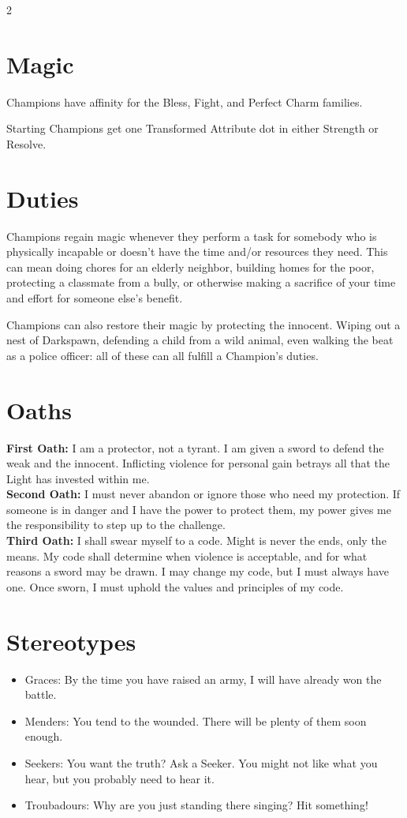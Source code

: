 \begin{multicols}{2}
\section*{Magic}
Champions have affinity for the Bless, Fight, and Perfect Charm families.

Starting Champions get one Transformed Attribute dot in either Strength or Resolve. 

\section*{Duties}
Champions regain magic whenever they perform a task for somebody who is physically incapable or doesn't have the time and/or resources they need. This can mean doing chores for an elderly neighbor, building homes for the poor, protecting a classmate from a bully, or otherwise making a sacrifice of your time and effort for someone else's benefit. 

Champions can also restore their magic by protecting the innocent. Wiping out a nest of Darkspawn, defending a child from a wild animal, even walking the beat as a police officer: all of these can all fulfill a Champion's duties. 

\section*{Oaths}
\noindent \textbf{First Oath:} I am a protector, not a tyrant. I am given a sword to defend the weak and the innocent. Inflicting violence for personal gain betrays all that the Light has invested within me. \\

\noindent \textbf{Second Oath:} I must never abandon or ignore those who need my protection. If someone is in danger and I have the power to protect them, my power gives me the responsibility to step up to the challenge.\\

\noindent \textbf{Third Oath:} I shall swear myself to a code. Might is never the ends, only the means. My code shall determine when violence is acceptable, and for what reasons a sword may be drawn. I may change my code, but I must always have one. Once sworn, I must uphold the values and principles of my code. 

\section*{Stereotypes}
\begin{itemize}
\item Graces: By the time you have raised an army, I will have already won the battle. 
\item Menders: You tend to the wounded. There will be plenty of them soon enough.
\item Seekers: You want the truth? Ask a Seeker. You might not like what you hear, but you probably need to hear it. 
\item Troubadours: Why are you just standing there singing? Hit something! 


\end{itemize}
\end{multicols}
